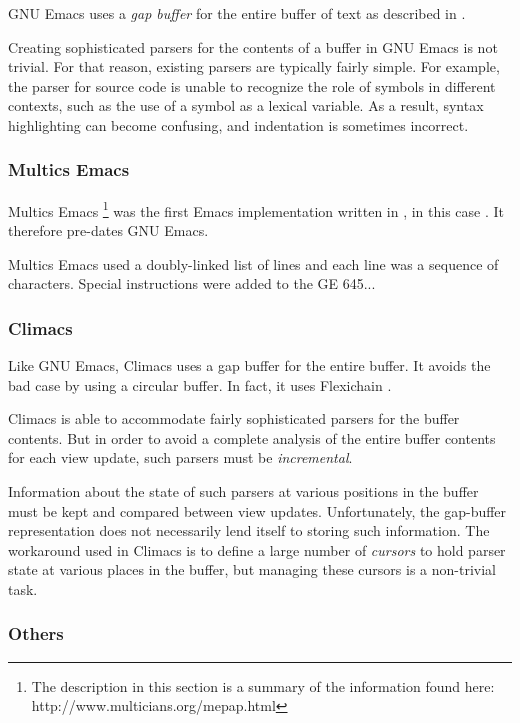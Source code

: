 GNU Emacs \cite{GNUEmacsLispReferenceManual}
\cite{CraftOfTextEditiing} uses a \emph{gap buffer} for the entire
buffer of text as described in .

Creating sophisticated parsers for the contents of a buffer in GNU
Emacs is not trivial.  For that reason, existing parsers are typically
fairly simple.  For example, the parser for \commonlisp{} source code
is unable to recognize the role of symbols in different contexts, such
as the use of a \commonlisp{} symbol as a lexical variable.  As a
result, syntax highlighting can become confusing, and indentation is
sometimes incorrect.

\subsubsection{Multics Emacs}

Multics Emacs%
\footnote{The description in this section is a summary of the
  information found here: http://www.multicians.org/mepap.html}
was the first Emacs implementation written in \lisp{}, in this case
\multics{} \maclisp{}.  It therefore pre-dates GNU Emacs.

Multics Emacs used a doubly-linked list of lines and each line was a
sequence of characters.  Special instructions were added to the GE
645...

\subsubsection{Climacs}

Like GNU Emacs, Climacs uses a gap buffer for the entire buffer.  It
avoids the bad case by using a circular buffer.  In fact, it uses
Flexichain \cite{flexichain}.

Climacs is able to accommodate fairly sophisticated parsers for the
buffer contents.  But in order to avoid a complete analysis of the
entire buffer contents for each view update, such parsers must be
\emph{incremental}.

Information about the state of such parsers at various positions in
the buffer must be kept and compared between view updates.
Unfortunately, the gap-buffer representation does not necessarily lend
itself to storing such information.  The workaround used in Climacs is
to define a large number of \emph{cursors} to hold parser state at
various places in the buffer, but managing these cursors is a
non-trivial task.

\subsubsection{Others}

